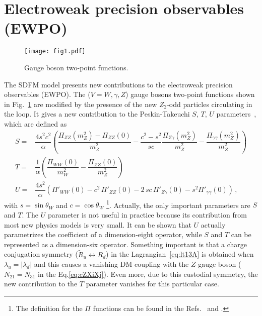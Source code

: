 \section{Electroweak precision observables (EWPO) }
\label{sec:EWPO}
\begin{figure}[h]
\begin{center}
\texttt{[image: fig1.pdf]}
\end{center}
\caption{Gauge boson two-point  functions.}
\label{fig:STU-propagator}
\end{figure}
The SDFM model presents new contributions to the electroweak precision observables (EWPO). 
The ($V = W,\gamma, Z$) gauge bosons  two-point functions shown in Fig.~\ref{fig:STU-propagator} are modified by the presence of the new $Z_2$-odd particles circulating in the loop. 
It gives a new contribution to the Peskin-Takeuchi $S$, $T$, $U$ parameters~\cite{PhysRevD.46.381}, which are defined as
%
\begin{align}
\label{eq:ST-definition}
S=&\dfrac{4s^2c^2}{\alpha}\left(\dfrac{\Pi_{ZZ}(m_Z^2)
-\Pi_{ZZ}(0)}{m_Z^2}-\dfrac{c^2-s^2}{sc}\dfrac{\Pi_{Z\gamma}(m_Z^2)}{m_Z^2}
-\dfrac{\Pi_{\gamma\gamma}(m_Z^2)}{m_Z^2}\right)\\
T=&\dfrac{1}{\alpha}\left(\dfrac{\Pi_{WW}(0)}{m_W^2}-\dfrac{\Pi_{ZZ}(0)}{m_Z^2}\right)\\
U=&\dfrac{4 s^2}{\alpha}\left(\Pi'_{WW}(0)-c^2\,\Pi'_{ZZ}(0)-2\,sc\,\Pi'_{Z\gamma}(0)-s^2\Pi'_{\gamma\gamma}(0)\right) \,,
\end{align}
with $s=\sin\theta_W$ and $c=\cos\theta_W$ \footnote{The definition for the $\Pi$ functions can be found in the Refs.~\cite{Abe:2014gua} and \cite{D'Eramo:2007ga}.}.  
%
Actually, the only important parameters are $S$ and $T$. The $U$ parameter is not useful in practice because its contribution from most new physics models is very small. It can be shown that $U$ actually parametrizes the coefficient of a dimension-eight operator, while $S$ and $T$ can be represented as a dimension-six operator. 
%
Something important is that a charge conjugation symmetry ($\tilde{R}_u\leftrightarrow R_d$) in the Lagrangian~\eqref{eq:lt13A} 
is obtained when $\lambda_u=|\lambda_d|$ and this causes a vanishing DM coupling with the $Z$ gauge boson ($N_{21}=N_{31}$ in the Eq.\eqref{eq:cZXiXj}). Even more, due to this custodial symmetry, the new contribution to the $T$ parameter vanishes for this particular case. 

